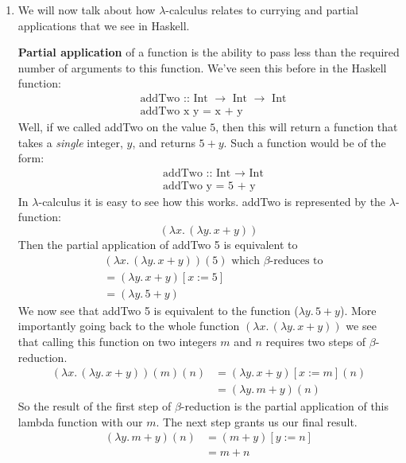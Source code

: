 \documentclass[12pt]{article}
\begin{document}
\begin{enumerate}
\item We will now talk about how $\lambda$-calculus relates to currying and partial applications that we see in Haskell.
\par \textbf{Partial application} of a function is the ability to pass less than the required number of arguments to this function. We've seen this before in the Haskell function:
\begin{align*}
	&\text{addTwo :: Int $\rightarrow$ Int $\rightarrow$ Int}\\
	&\text{addTwo x y = x + y}
\end{align*}
Well, if we called addTwo on the value $5$, then this will return a function that takes a \textit{single} integer, $y$, and returns $5 + y$. Such a function would be of the form:
\begin{align*}
	&\text{addTwo :: Int $\rightarrow$ Int}\\
	&\text{addTwo y = 5 + y}
\end{align*}
In $\lambda$-calculus it is easy to see how this works. addTwo is represented by the $\lambda$-function: $$(\lambda x.\,(\lambda y.\,x+y))$$ Then the partial application of addTwo 5 is equivalent to
\begin{align*}
&(\lambda x.\,(\lambda y.\,x+y))(5)\text{ which } \beta\text{-reduces to}\\
	&= (\lambda y. \, x + y)[x:=5]\\
	&= (\lambda y. \, 5 + y)
\end{align*}
We now see that addTwo 5 is equivalent to the function ($\lambda y. \, 5 + y$). More importantly going back to the whole function $(\lambda x.\,(\lambda y.\,x+y))$ we see that calling this function on two integers $m$ and $n$ requires two steps of $\beta$-reduction. \begin{align*}
(\lambda x.\,(\lambda y.\,x+y))(m)(n) &= (\lambda y. \, x + y)[x:=m](n)\\
	&= (\lambda y. \, m + y)(n)
\end{align*}
So the result of the first step of $\beta$-reduction is the partial application of this lambda function with our $m$. The next step grants us our final result. 
\begin{align*}
(\lambda y.\,m+y)(n)	&= (m + y)[y:=n]\\
	&= m + n
\end{align*}

\bigskip




\end{enumerate}
\end{document}
